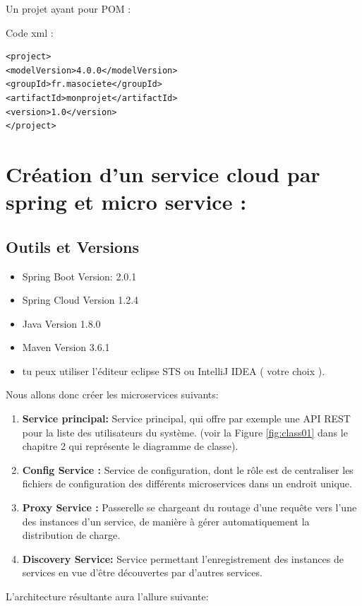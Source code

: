     Un projet ayant pour POM :
    
    Code xml : 
 
     
    \lstset{language=XML}
\begin{lstlisting}
<project>
<modelVersion>4.0.0</modelVersion>
<groupId>fr.masociete</groupId>
<artifactId>monprojet</artifactId>
<version>1.0</version>
</project>
\end{lstlisting}
    











\section{Création d'un service cloud par spring et micro service :}

\subsection{Outils et Versions}

\begin{itemize}
\item Spring Boot Version: 2.0.1
\item Spring Cloud Version 1.2.4
\item Java Version 1.8.0 
\item Maven Version 3.6.1
\item  tu peux utiliser l'éditeur eclipse STS ou IntelliJ IDEA ( votre choix ).
\end{itemize}



Nous allons donc créer les microservices suivants:
\begin{enumerate}
	
\item 	\textbf{Service principal:} Service principal, qui offre par exemple une API REST pour  la liste des utilisateurs du système.   (voir la Figure \ref{fig:class01} dans le chapitre 2 qui représente le diagramme de classe).
	
\item 	\textbf{Config Service :} Service de configuration, dont le rôle est de centraliser les fichiers de configuration des différents microservices dans un endroit unique.
	
\item 		\textbf{Proxy Service :} Passerelle se chargeant du routage d'une requête vers l'une des instances d'un service, de manière à gérer automatiquement la distribution de charge.
	
\item 		\textbf{Discovery Service:} Service permettant l'enregistrement des instances de services en vue d'être découvertes par d'autres services.
\end{enumerate}
L'architecture résultante aura l'allure suivante:


